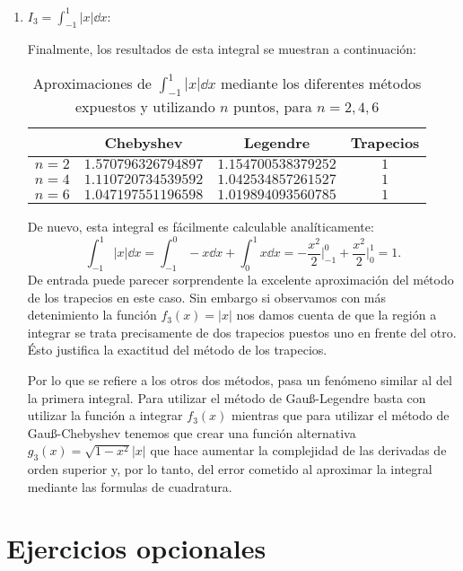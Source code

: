 \documentclass[a4paper]{article}
\begin{document}
\begin{enumerate}
    \item $\displaystyle I_3=\int_{-1}^1|x|\dd x$:\par
    Finalmente, los resultados de esta integral se muestran a continuación:
    \begin{table}[ht]
        \centering
        \captionsetup{width=0.9\textwidth}
        \begin{tabular}{|c|c|c|c|}
            \cline{2-4}
            \multicolumn{1}{c|}{} & Chebyshev & Legendre & Trapecios \\
            \hline
            $n=2$ & $1.570796326794897$ & $1.154700538379252$ & $1$ \\
            \hline
            $n=4$ & $1.110720734539592$ & $1.042534857261527$ & $1$ \\
            \hline
            $n=6$ & $1.047197551196598$ & $1.019894093560785$ & $1$ \\
            \hline
        \end{tabular}
        \caption{Aproximaciones de $\int_{-1}^1|x|\dd x$ mediante los diferentes métodos expuestos y utilizando $n$ puntos, para $n=2,4,6$}
    \end{table}\par
    De nuevo, esta integral es fácilmente calculable analíticamente: $$\int_{-1}^1|x|\dd x=\int_{-1}^0-x\dd x+\int_0^1x\dd x=-\frac{x^2}{2}\Bigg|_{-1}^0+\frac{x^2}{2}\Bigg|_0^1=1.$$
    De entrada puede parecer sorprendente la excelente aproximación del método de los trapecios en este caso. Sin embargo si observamos con más detenimiento la función $f_3(x)=|x|$ nos damos cuenta de que la región a integrar se trata precisamente de dos trapecios puestos uno en frente del otro. Ésto justifica la exactitud del método de los trapecios.\par 
    Por lo que se refiere a los otros dos métodos, pasa un fenómeno similar al del la primera integral. Para utilizar el método de Gau\ss-Legendre basta con utilizar la función a integrar $f_3(x)$ mientras que para utilizar el método de Gau\ss-Chebyshev tenemos que crear una función alternativa $g_3(x)=\sqrt{1-x^2}|x|$ que hace aumentar la complejidad de las derivadas de orden superior y, por lo tanto, del error cometido al aproximar la integral mediante las formulas de cuadratura.
\end{enumerate}
\section{Ejercicios opcionales}
\end{document}

